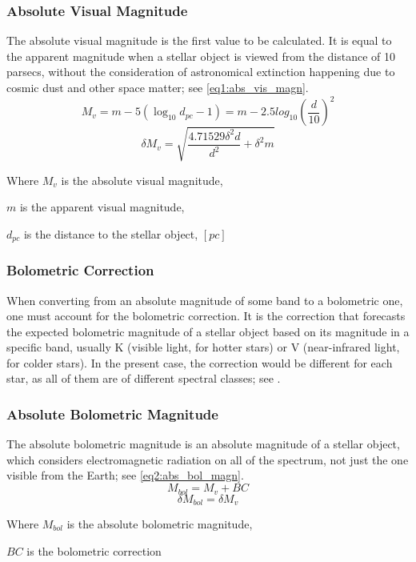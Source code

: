 \documentclass[stu, 11pt, a4paper, floatsintext]{apa7}
\begin{document}
	\subsubsection{Absolute Visual Magnitude}
	The absolute visual magnitude is the first value to be calculated. It is equal to the apparent magnitude when a stellar object is viewed from the distance of 10 parsecs, without the consideration of astronomical extinction happening due to cosmic dust and other space matter; see \cref{eq1:abs_vis_magn}.
	\begin{equation}
		\label{eq1:abs_vis_magn}
		M_v=m-5\left(\log_{10}d_{pc} - 1\right)=m-2.5log_{10}\left(\frac{d}{10}\right)^2
	\end{equation}
	\begin{equation*}
		\delta M_v=\sqrt{\frac{4.71529\delta^2d}{d^2}+\delta^2m}
	\end{equation*}
	\begin{center}
		Where $M_v$ is the absolute visual magnitude,
		
 		$m$ is the apparent visual magnitude,
 
 		$d_{pc}$ is the distance to the stellar object, $[pc]$
	\end{center}
	\subsubsection{Bolometric Correction}
	When converting from an absolute magnitude of some band to a bolometric one, one must account for the bolometric correction. It is the correction that forecasts the expected bolometric magnitude of a stellar object based on its magnitude in a specific band, usually K (visible light, for hotter stars) or V (near-infrared light, for colder stars). In the present case, the correction would be different for each star, as all of them are of different spectral classes; see .
	\subsubsection{Absolute Bolometric Magnitude}
	The absolute bolometric magnitude is an absolute magnitude of a stellar object, which considers electromagnetic radiation on all of the spectrum, not just the one visible from the Earth; see \cref{eq2:abs_bol_magn}.
	\begin{equation}
		\label{eq2:abs_bol_magn}
		M_{bol}=M_v+BC
	\end{equation}
	\begin{equation*}
		\delta M_{bol} = \delta M_v
	\end{equation*}
	\begin{center}
		Where $M_{bol}$ is the absolute bolometric magnitude,
		
 		$BC$ is the bolometric correction
	\end{center}
\end{document}

